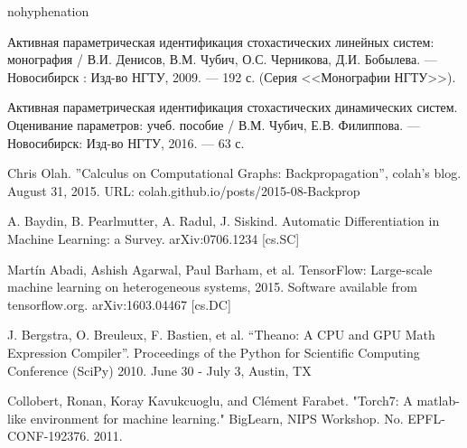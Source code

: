 \documentclass[a4paper,14pt]{extarticle}
\begin{document}
\begin{thebibliography}{9}

\begin{hyphenrules}{nohyphenation} 


\begin{sloppypar}

 Активная параметрическая идентификация стохастических
линейных систем: монография / В.И. Денисов, В.М. Чубич, О.С. Черникова, Д.И.
Бобылева. --- Новосибирск : Изд-во НГТУ, 2009. --- 192 с. (Серия <<Монографии
НГТУ>>).

 Активная параметрическая идентификация стохастических
динамических систем. Оценивание параметров: учеб. пособие / В.М. Чубич, Е.В.
Филиппова. --- Новосибирск: Изд-во НГТУ, 2016. --- 63 с.

 Chris Olah. ''Calculus on Computational Graphs:
Backpropagation'', colah's blog. August 31, 2015.
URL: colah.github.io/posts/2015-08-Backprop

 A. Baydin, B. Pearlmutter, A. Radul, J. Siskind.
Automatic Differentiation in Machine Learning: a Survey. {arXiv:0706.1234 [cs.SC]}

 Martín Abadi, Ashish Agarwal, Paul Barham, et al.
TensorFlow: Large-scale machine learning on heterogeneous systems,
2015. Software available from tensorflow.org. {arXiv:1603.04467 [cs.DC]}

 J. Bergstra, O. Breuleux, F. Bastien, et al. “Theano: A CPU
and GPU Math Expression Compiler”. Proceedings of the Python for Scientific
Computing Conference (SciPy) 2010. June 30 - July 3, Austin, TX

 Collobert, Ronan, Koray Kavukcuoglu, and Clément Farabet.
"Torch7: A matlab-like environment for machine learning." BigLearn, NIPS
Workshop. No. EPFL-CONF-192376. 2011.

\end{sloppypar}

\end{hyphenrules}

\end{thebibliography}
\end{document}

